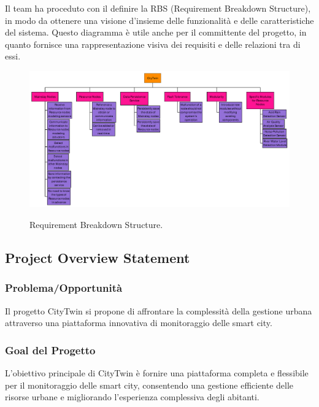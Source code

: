Il team ha proceduto con il definire la RBS (Requirement Breakdown Structure), in modo da ottenere una visione d'insieme delle funzionalità e delle caratteristiche del sistema. Questo diagramma è utile anche per il committente del progetto, in quanto fornisce una rappresentazione visiva dei requisiti e delle relazioni tra di essi.

\begin{figure}[H]
    \centering
    \caption{Requirement Breakdown Structure.}
    \includegraphics[height=.8\textwidth, angle=90]{figures/RBS.pdf}
    \label{fig:rbs}
\end{figure}

\subsection{Project Overview Statement}

\subsubsection{Problema/Opportunità}

Il progetto CityTwin si propone di affrontare la complessità della gestione urbana attraverso una piattaforma innovativa di monitoraggio delle smart city.

\subsubsection{Goal del Progetto}

L'obiettivo principale di CityTwin è fornire una piattaforma completa e flessibile per il monitoraggio delle smart city, consentendo una gestione efficiente delle risorse urbane e migliorando l'esperienza complessiva degli abitanti.

